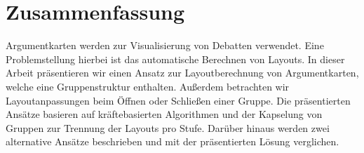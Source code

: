 \chapter*{Zusammenfassung}

Argumentkarten werden zur Visualisierung von Debatten verwendet. Eine Problemstellung hierbei ist das automatische Berechnen von Layouts.
In dieser Arbeit präsentieren wir einen Ansatz zur Layoutberechnung von Argumentkarten, welche eine Gruppenstruktur enthalten.
Außerdem betrachten wir Layoutanpassungen beim Öffnen oder Schließen einer Gruppe.
Die präsentierten Ansätze basieren auf kräftebasierten Algorithmen und der Kapselung von Gruppen zur Trennung der Layouts pro Stufe. 
Darüber hinaus werden zwei alternative Ansätze beschrieben und mit der präsentierten Lösung verglichen.